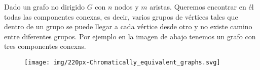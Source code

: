 Dado un grafo no dirigido $G$ con $n$ nodos y $m$ aristas. Queremos encontrar en él todas las componentes conexas, es decir, varios grupos de vértices tales que dentro de un grupo se puede llegar a cada vértice desde otro y no existe camino entre diferentes grupos. Por ejemplo en la imagen de abajo tenemos un grafo con tres componentes conexas.

\begin{figure}[h!]
	\centering
	\texttt{[image: img/220px-Chromatically\_equivalent\_graphs.svg]}
	\label{fig:220px-chromaticallyequivalentgraphs}
\end{figure}
